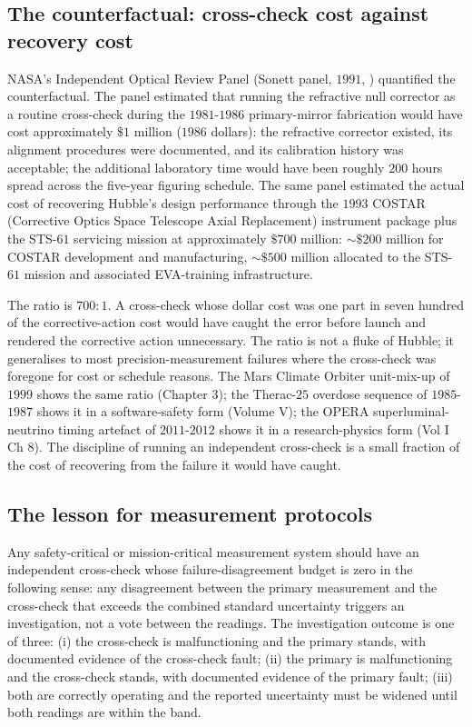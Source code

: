\subsection{The counterfactual: cross-check cost against
recovery cost}

NASA's Independent Optical Review Panel (Sonett panel,
$1991$, \cite{web:ch04t3b-iorp-1991}) quantified the
counterfactual. The panel estimated that running the
refractive null corrector as a routine cross-check during
the $1981$-$1986$ primary-mirror fabrication would have cost
approximately $\$1$ million ($1986$ dollars): the refractive
corrector existed, its alignment procedures were documented,
and its calibration history was acceptable; the additional
laboratory time would have been roughly $200$ hours spread
across the five-year figuring schedule. The same panel
estimated the actual cost of recovering Hubble's design
performance through the $1993$ COSTAR (Corrective Optics
Space Telescope Axial Replacement) instrument package plus
the STS-$61$ servicing mission at approximately $\$700$
million: $\sim \$200$ million for COSTAR development and
manufacturing, $\sim \$500$ million allocated to the
STS-$61$ mission and associated EVA-training infrastructure.

The ratio is $700{:}1$. A cross-check whose dollar cost was
one part in seven hundred of the corrective-action cost would
have caught the error before launch and rendered the
corrective action unnecessary. The ratio is not a fluke of
Hubble; it generalises to most precision-measurement failures
where the cross-check was foregone for cost or schedule
reasons. The Mars Climate Orbiter unit-mix-up of $1999$ shows
the same ratio (Chapter $3$); the Therac-$25$ overdose
sequence of $1985$-$1987$ shows it in a software-safety form
(Volume V); the OPERA superluminal-neutrino timing artefact
of $2011$-$2012$ shows it in a research-physics form (Vol I
Ch $8$). The discipline of running an independent cross-check
is a small fraction of the cost of recovering from the
failure it would have caught.

\subsection{The lesson for measurement protocols}

Any safety-critical or mission-critical measurement system
should have an independent cross-check whose
failure-disagreement budget is zero in the following sense:
any disagreement between the primary measurement and the
cross-check that exceeds the combined standard uncertainty
triggers an investigation, not a vote between the readings.
The investigation outcome is one of three: (i) the cross-check
is malfunctioning and the primary stands, with documented
evidence of the cross-check fault; (ii) the primary is
malfunctioning and the cross-check stands, with documented
evidence of the primary fault; (iii) both are correctly
operating and the reported uncertainty must be widened until
both readings are within the band.

